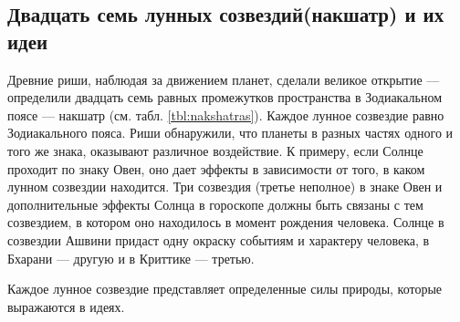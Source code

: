 \subsection{Двадцать семь лунных созвездий(накшатр) и их идеи}

Древние риши, наблюдая за движением планет, сделали великое открытие --- определили двадцать семь равных промежутков пространства в Зодиакальном поясе --- накшатр (см. табл. \ref{tbl:nakshatras}). Каждое лунное созвездие равно  Зодиакального пояса. Риши обнаружили, что планеты в разных частях одного и того же знака, оказывают различное воздействие. К примеру, если Солнце проходит по знаку Овен, оно дает эффекты в зависимости от того, в каком лунном созвездии находится. Три созвездия (третье неполное) в знаке Овен и дополнительные эффекты Солнца в гороскопе должны быть связаны с тем созвездием, в котором оно находилось в момент рождения человека. Солнце в созвездии Ашвини придаст одну окраску событиям и характеру человека, в Бхарани --- другую и в Криттике --- третью.

Каждое лунное созвездие представляет определенные силы природы, которые выражаются в идеях.

